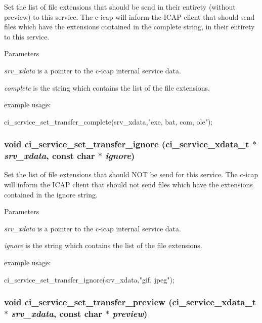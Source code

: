 Set the list of file extensions that should be send in their entirety (without preview) to this service. The c-\/icap will inform the ICAP client that should send files which have the extensions contained in the complete string, in their entirety to this service. 
\begin{DoxyParams}{Parameters}
\item[{\em srv\_\-xdata}]is a pointer to the c-\/icap internal service data. \item[{\em complete}]is the string which contains the list of the file extensions.\end{DoxyParams}
example usage: 
\begin{DoxyCode}
   ci_service_set_transfer_complete(srv_xdata,"exe, bat, com, ole");
\end{DoxyCode}
 \hypertarget{group__SERVICES_gac7e9338092f802bc81dfb26dc2bf0e96}{
\subsubsection[{ci\_\-service\_\-set\_\-transfer\_\-ignore}]{\setlength{\rightskip}{0pt plus 5cm}void ci\_\-service\_\-set\_\-transfer\_\-ignore ({\bf ci\_\-service\_\-xdata\_\-t} $\ast$ {\em srv\_\-xdata}, \/  const char $\ast$ {\em ignore})}}
\label{group__SERVICES_gac7e9338092f802bc81dfb26dc2bf0e96}


Set the list of file extensions that should NOT be send for this service. The c-\/icap will inform the ICAP client that should not send files which have the extensions contained in the ignore string. 
\begin{DoxyParams}{Parameters}
\item[{\em srv\_\-xdata}]is a pointer to the c-\/icap internal service data. \item[{\em ignore}]is the string which contains the list of the file extensions.\end{DoxyParams}
example usage: 
\begin{DoxyCode}
   ci_service_set_transfer_ignore(srv_xdata,"gif, jpeg");
\end{DoxyCode}
 \hypertarget{group__SERVICES_gafc50c2c4ef2c9d96c7f8d6c2f2bf5d2f}{
\subsubsection[{ci\_\-service\_\-set\_\-transfer\_\-preview}]{\setlength{\rightskip}{0pt plus 5cm}void ci\_\-service\_\-set\_\-transfer\_\-preview ({\bf ci\_\-service\_\-xdata\_\-t} $\ast$ {\em srv\_\-xdata}, \/  const char $\ast$ {\em preview})}}
\label{group__SERVICES_gafc50c2c4ef2c9d96c7f8d6c2f2bf5d2f}


